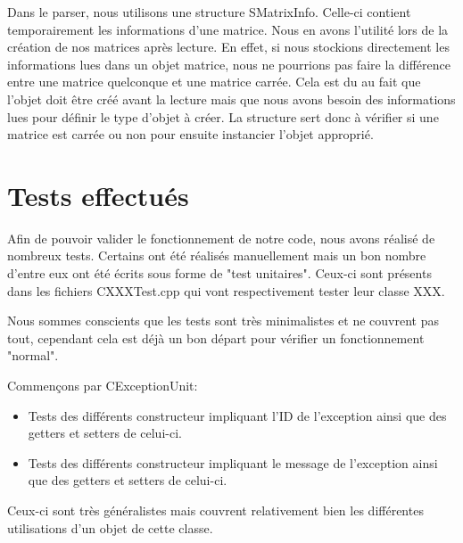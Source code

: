 		
	
		Dans le parser, nous utilisons une structure SMatrixInfo. Celle-ci contient temporairement les informations d'une matrice. Nous en avons l'utilité lors de la création de nos matrices après lecture. En effet, si nous stockions directement les informations lues dans un objet matrice, nous ne pourrions pas faire la différence entre une matrice quelconque et une matrice carrée. Cela est du au fait que l'objet doit être créé avant la lecture mais que nous avons besoin des informations lues pour définir le type d'objet à créer. La structure sert donc à vérifier si une matrice est carrée ou non pour ensuite instancier l'objet approprié.
	
	\chapter{Tests effectués}
		Afin de pouvoir valider le fonctionnement de notre code, nous avons réalisé de nombreux tests. Certains ont été réalisés manuellement mais un bon nombre d'entre eux ont été écrits sous forme de "test unitaires". Ceux-ci sont présents dans les fichiers CXXXTest.cpp qui vont respectivement tester leur classe XXX.
		
		Nous sommes conscients que les tests sont très minimalistes et ne couvrent pas tout, cependant cela est déjà un bon départ pour vérifier un fonctionnement "normal".
		
		Commençons par CExceptionUnit:
		\begin{itemize}
			\item Tests des différents constructeur impliquant l'ID de l'exception ainsi que des getters et setters de celui-ci.
			\item Tests des différents constructeur impliquant le message de l'exception ainsi que des getters et setters de celui-ci.\\
		\end{itemize}
		Ceux-ci sont très généralistes mais couvrent relativement bien les différentes utilisations d'un objet de cette classe.
		

